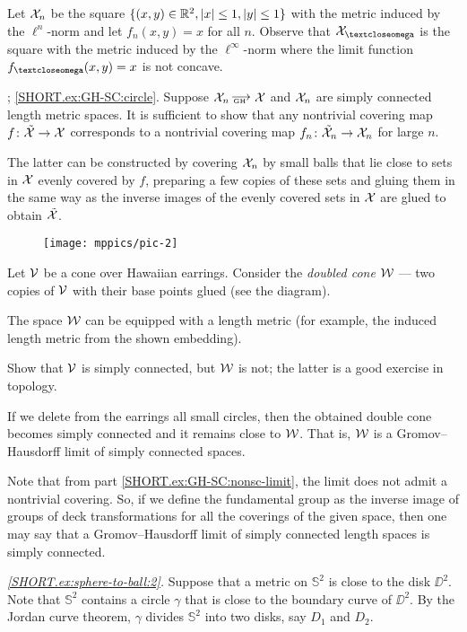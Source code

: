 Let $\mathcal{X}_n$ be the square $\{( x,y)\in \R^2, |x|\le 1, |y|\le 1\}$ with the metric induced by the $\ell^n$-norm and let $f_n(x,y)=x$ for all $n$.
Observe that $\spc{X}_\o$ is the square with the metric induced by the $\ell^\infty$-norm where the limit function $f_\o(x,y)=x$ is not concave.

\parbf{\ref{ex:GH-SC}}; \ref{SHORT.ex:GH-SC:circle}.
Suppose $\spc{X}_n\GHto \spc{X}$ and $\mathcal{X}_n$ are simply connected length metric spaces.
It is sufficient to show that any nontrivial covering map $f\:\tilde{\spc{X}}\to \spc{X}$ corresponds to a nontrivial covering map $f_n\:\tilde{\spc{X}}_n\to \spc{X}_n$ for large $n$.

The latter can be constructed by covering $\mathcal{X}_n$ by small balls that lie close to sets in $\mathcal{X}$ evenly covered by $f$, preparing a few copies of these sets and gluing them in the same way as the inverse images of the evenly covered sets in $\mathcal{X}$ are glued to obtain $\tilde{\mathcal{X}}$.

\begin{wrapfigure}{r}{43 mm}
\vskip-8mm
\centering
\texttt{[image: mppics/pic-2]}
\end{wrapfigure}

Let $\mathcal{V}$ be a cone over Hawaiian earrings.
Consider the {}\emph{doubled cone} $\mathcal{W}$ --- two copies of $\mathcal{V}$ with  their base points glued (see the diagram).

The space $\mathcal{W}$ can be equipped with a length metric
(for example, the induced length metric from the shown embedding).

Show that $\mathcal{V}$ is simply connected, but $\mathcal{W}$ is not; the latter is a good exercise in topology.

If we delete from the earrings all small circles, then the obtained double cone becomes simply connected and it remains close to $\mathcal{W}$.
That is, $\mathcal{W}$ is a Gromov--Hausdorff limit of simply connected spaces.

Note that from part \ref{SHORT.ex:GH-SC:nonsc-limit}, the limit does not admit a nontrivial covering.
So, if we define the fundamental group as the inverse image of groups of deck transformations for all the coverings of the given space, then one may say that a Gromov--Hausdorff limit of simply connected length spaces is simply connected.

\parbf{\ref{ex:sphere-to-ball},}
\textit{\ref{SHORT.ex:sphere-to-ball:2}.}
Suppose that a metric on $\mathbb{S}^2$ is close to the disk $\DD^2$.
Note that $\mathbb{S}^2$ contains a circle $\gamma$ that is close to the boundary curve of $\DD^2$.
By the Jordan curve theorem, $\gamma$ divides $\mathbb{S}^2$ into two disks, say $D_1$ and $D_2$.


